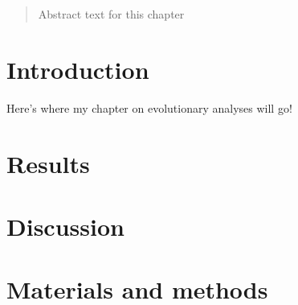 \begin{abstract}
\noindent
Abstract text for this chapter
\end{abstract}

\section*{Introduction}
Here's where my chapter on evolutionary analyses will go!

\section*{Results}

\section*{Discussion}

\section*{Materials and methods}
